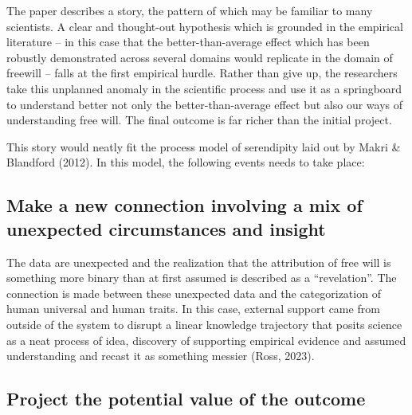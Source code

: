 \documentclass[authordate, commentary]{jote-new-article}
\author[1]{\mbox{Wendy Ross\orcid{0000-0002-0461-7660}}}
\affil[1]{London Metropolitan}
\author[2]{\mbox{David Grüning\orcid{0000-0002-9274-5477}}}
\affil[2]{Heidelberg}
\author[3]{\mbox{Stuart Firestein\orcid{0000-0003-1774-5853}}}
\affil[3]{Columbia}
\begin{document}
\begin{frontmatter}
  \maketitle
  \begin{abstract}
    \printabstracttext
  \end{abstract}
\end{frontmatter}



	The paper describes a story, the pattern of which may be familiar to many scientists. A clear and thought-out hypothesis which is grounded in the empirical literature -- in this case that the better-than-average effect which has been robustly demonstrated across several domains would replicate in the domain of freewill -- falls at the first empirical hurdle. Rather than give up, the researchers take this unplanned anomaly in the scientific process and use it as a springboard to understand better not only the better-than-average effect but also our ways of understanding free will. The final outcome is far richer than the initial project.



	This story would neatly fit the process model of serendipity laid out by Makri \& Blandford (2012). In this model, the following events needs to take place:



	\subsection{Make a new connection involving a mix of unexpected circumstances and insight}



	The data are unexpected and the realization that the attribution of free will is something more binary than at first assumed is described as a “revelation”. The connection is made between these unexpected data and the categorization of human universal and human traits. In this case, external support came from outside of the system to disrupt a linear knowledge trajectory that posits science as a neat process of idea, discovery of supporting empirical evidence and assumed understanding and recast it as something messier (Ross, 2023).



	\subsection{Project the potential value of the outcome}
\end{document}

